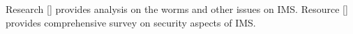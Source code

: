 Research [\cite{mannan2005secure}] provides analysis on the worms and other issues on IMS\@.
Resource [\cite{mannan2004secure}] provides comprehensive survey on security aspects of IMS\@.